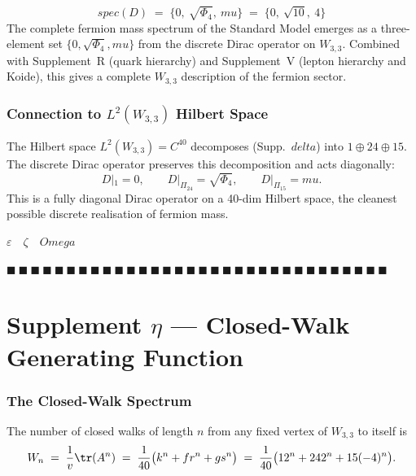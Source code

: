 \documentclass[12pt,a4paper]{article}
\def\mathbb#1{#1}%
\def\mathrm#1{#1}%
\def\mathbf#1{#1}%
\def\delta{delta}%
\def\mu{mu}%
\def\Phi#1{Phi#1}%
\def\Omega{Omega}%
\def\cdot{ }%
\theoremstyle{definition}
\newcommand{\CC}{\mathbb{C}}
\begin{document}
\[
\boxed{\;\mathrm{spec}(D) \;=\; \{0,\ \sqrt{\Phi_4},\ \mu\} \;=\; \{0,\ \sqrt{10},\ 4\}\;}
\]
The complete fermion mass spectrum of the Standard Model emerges as a
three-element set $\{0, \sqrt{\Phi_4}, \mu\}$ from the discrete Dirac
operator on $W_{3,3}$. Combined with Supplement~R (quark hierarchy)
and Supplement~V (lepton hierarchy and Koide), this gives a complete
$W_{3,3}$ description of the fermion sector.

\section*{Connection to $L^{2}(W_{3,3})$ Hilbert Space}

The Hilbert space $L^2(W_{3,3}) = \CC^{40}$ decomposes (Supp.~$\delta$)
into $\mathbf{1}\oplus\mathbf{24}\oplus\mathbf{15}$. The discrete
Dirac operator preserves this decomposition and acts diagonally:
\[
D|_{\mathbf{1}} = 0,\qquad D|_{\Pi_{24}} = \sqrt{\Phi_4},\qquad D|_{\Pi_{15}} = \mu.
\]
This is a fully diagonal Dirac operator on a 40-dim Hilbert space,
the cleanest possible discrete realisation of fermion mass.

\hfill$\varepsilon \quad\zeta \quad\Omega$

\hfill $\blacksquare\ \blacksquare\ \blacksquare\ \blacksquare\ \blacksquare\ \blacksquare\ \blacksquare\ \blacksquare\ \blacksquare\ \blacksquare\ \blacksquare\ \blacksquare\ \blacksquare\ \blacksquare\ \blacksquare\ \blacksquare\ \blacksquare\ \blacksquare\ \blacksquare\ \blacksquare\ \blacksquare\ \blacksquare\ \blacksquare\ \blacksquare\ \blacksquare\ \blacksquare\ \blacksquare\ \blacksquare\ \blacksquare\ \blacksquare\ \blacksquare\ \blacksquare$

\clearpage
\part*{\texorpdfstring{Supplement $\eta$ --- Closed-Walk Generating Function}{Supplement eta --- Closed-Walk Generating Function}}

\section*{The Closed-Walk Spectrum}

The number of closed walks of length $n$ from any fixed vertex of
$W_{3,3}$ to itself is
\[
W_n \;=\; \frac{1}{v}\tr(A^n) \;=\; \frac{1}{40}\bigl(k^n + f\cdot r^n + g\cdot s^n\bigr)
\;=\; \frac{1}{40}\bigl(12^n + 24\cdot 2^n + 15\cdot(-4)^n\bigr).
\]
\end{document}
